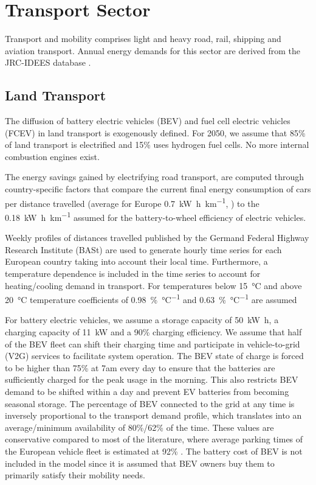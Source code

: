 \section{Transport Sector}
\label{sec:si:transport}

Transport and mobility comprises light and heavy road, rail, shipping and
aviation transport. Annual energy demands for this sector are derived from the
JRC-IDEES database .

\subsection{Land Transport}
\label{sec:si:transport:land}

The diffusion of battery electric vehicles (BEV) and fuel cell electric vehicles
(FCEV) in land transport is exogenously defined. For 2050, we assume that 85\%
of land transport is electrified and 15\% uses hydrogen fuel cells. No more
internal combustion engines exist.

The energy savings gained by electrifying road transport, are computed through
country-specific factors that compare the current final energy consumption of
cars per distance travelled (average for Europe
\SI{0.7}{\kilo\watt\hour\per\kilo\metre}, \citeS{}) to the
\SI{0.18}{\kilo\watt\hour\per\kilo\metre} assumed for the battery-to-wheel
efficiency of electric vehicles.

Weekly profiles of distances travelled published by the Germand Federal Highway
Research Institute (BASt) \citeS{} are used to generate hourly time series for
each European country taking into account their local time. Furthermore, a
temperature dependence is included in the time series to account for
heating/cooling demand in transport. For temperatures below \SI{15}{\celsius}
and above \SI{20}{\celsius} temperature coefficients of
\SI{0.98}{\percent\per\celsius} and \SI{0.63}{\percent\per\celsius} are assumed

For battery electric vehicles, we assume a storage capacity of
\SI{50}{\kilo\watt\hour}, a charging capacity of \SI{11}{\kilo\watt} and a 90\%
charging efficiency. We assume that half of the BEV fleet can shift their
charging time and participate in vehicle-to-grid (V2G) services to facilitate
system operation. The BEV state of charge is forced to be higher than 75\% at
7am every day to ensure that the batteries are sufficiently charged for the peak
usage in the morning. This also restricts BEV demand to be shifted within a day
and prevent EV batteries from becoming seasonal storage. The percentage of BEV
connected to the grid at any time is inversely proportional to the transport
demand profile, which translates into an average/minimum availability of
80\%/62\% of the time. These values are conservative compared to most of the
literature, where average parking times of the European vehicle fleet is
estimated at 92\% \citeS{}. The battery cost of BEV is not included in the model
since it is assumed that BEV owners buy them to primarily satisfy their mobility
needs.

